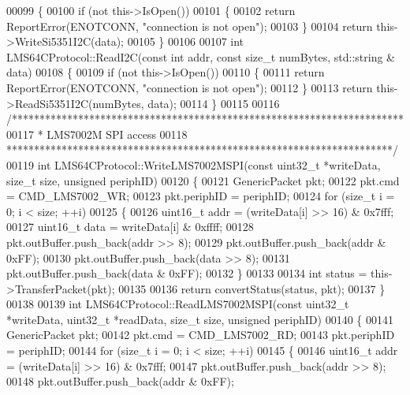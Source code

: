 \begin{DoxyCode}
00099 \{
00100     \textcolor{keywordflow}{if} (not this->IsOpen())
00101     \{
00102         \textcolor{keywordflow}{return} ReportError(ENOTCONN, \textcolor{stringliteral}{"connection is not open"});
00103     \}
00104     \textcolor{keywordflow}{return} this->WriteSi5351I2C(data);
00105 \}
00106 
00107 \textcolor{keywordtype}{int} LMS64CProtocol::ReadI2C(\textcolor{keyword}{const} \textcolor{keywordtype}{int} addr, \textcolor{keyword}{const} \textcolor{keywordtype}{size\_t} numBytes, std::string &
      data)
00108 \{
00109     \textcolor{keywordflow}{if} (not this->IsOpen())
00110     \{
00111         \textcolor{keywordflow}{return} ReportError(ENOTCONN, \textcolor{stringliteral}{"connection is not open"});
00112     \}
00113     \textcolor{keywordflow}{return} this->ReadSi5351I2C(numBytes, data);
00114 \}
00115 
00116 \textcolor{comment}{/***********************************************************************}
00117 \textcolor{comment}{ * LMS7002M SPI access}
00118 \textcolor{comment}{ **********************************************************************/}
00119 \textcolor{keywordtype}{int} LMS64CProtocol::WriteLMS7002MSPI(\textcolor{keyword}{const} uint32\_t *writeData, \textcolor{keywordtype}{size\_t} size, \textcolor{keywordtype}{unsigned} periphID)
00120 \{
00121     GenericPacket pkt;
00122     pkt.cmd = CMD_LMS7002_WR;
00123     pkt.periphID = periphID;
00124     \textcolor{keywordflow}{for} (\textcolor{keywordtype}{size\_t} i = 0; i < size; ++i)
00125     \{
00126         uint16\_t addr = (writeData[i] >> 16) & 0x7fff;
00127         uint16\_t data = writeData[i] & 0xffff;
00128         pkt.outBuffer.push\_back(addr >> 8);
00129         pkt.outBuffer.push\_back(addr & 0xFF);
00130         pkt.outBuffer.push\_back(data >> 8);
00131         pkt.outBuffer.push\_back(data & 0xFF);
00132     \}
00133 
00134     \textcolor{keywordtype}{int} status = this->TransferPacket(pkt);
00135 
00136     \textcolor{keywordflow}{return} convertStatus(status, pkt);
00137 \}
00138 
00139 \textcolor{keywordtype}{int} LMS64CProtocol::ReadLMS7002MSPI(\textcolor{keyword}{const} uint32\_t *writeData, uint32\_t *readData, \textcolor{keywordtype}{size\_t} 
      size, \textcolor{keywordtype}{unsigned} periphID)
00140 \{
00141     GenericPacket pkt;
00142     pkt.cmd = CMD_LMS7002_RD;
00143     pkt.periphID = periphID;
00144     \textcolor{keywordflow}{for} (\textcolor{keywordtype}{size\_t} i = 0; i < size; ++i)
00145     \{
00146         uint16\_t addr = (writeData[i] >> 16) & 0x7fff;
00147         pkt.outBuffer.push\_back(addr >> 8);
00148         pkt.outBuffer.push\_back(addr & 0xFF);

\end{DoxyCode}
